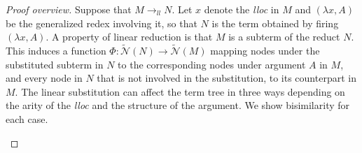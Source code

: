 \documentclass[xchauthor,chkrefs,GCNS,amsmath,amsthm,rotating,leaveRGB]{tcsg}
\theoremstyle{plain}
\theoremstyle{definition}
\newcommand{\Nodes}{\mathcal{N}}
\newcommand{\ExtendedNodes}{\tilde{\Nodes}}
\newcommand{\llred}{\rightarrow_{ll}}
\begin{document}
%
\begin{proof}[Proof overview]
Suppose that $M \llred N$. Let $x$ denote the \emph{lloc} in $M$ and
$(\lambda x, A)$ be the generalized redex involving it, so that $N$ is the
term obtained by firing $(\lambda x, A)$. A property of linear reduction is
that $M$ is a subterm of the reduct $N$. This induces a function $\Phi :
\ExtendedNodes (N) \rightarrow \ExtendedNodes (M)$ mapping nodes under the
substituted subterm in $N$ to the corresponding nodes under argument $A$ in
$M$, and every node in $N$ that is not involved in the substitution, to its
counterpart in $M$. The linear substitution can affect the term tree in three
ways depending on the arity of the \emph{lloc} and the structure of the
argument. We show bisimilarity for each case.


\begin{figure}
\begin{sgmlfig}
\end{sgmlfig}
\end{figure}
\end{proof}
\end{document}
